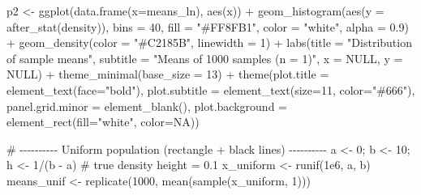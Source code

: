 \documentclass[
  letterpaper,
  DIV=11,
  numbers=noendperiod]{scrreprt}
\newenvironment{Shaded}{\begin{snugshade}}{\end{snugshade}}
\newcommand{\AttributeTok}[1]{\textcolor[rgb]{0.40,0.45,0.13}{#1}}
\newcommand{\CommentTok}[1]{\textcolor[rgb]{0.37,0.37,0.37}{#1}}
\newcommand{\ConstantTok}[1]{\textcolor[rgb]{0.56,0.35,0.01}{#1}}
\newcommand{\DecValTok}[1]{\textcolor[rgb]{0.68,0.00,0.00}{#1}}
\newcommand{\FloatTok}[1]{\textcolor[rgb]{0.68,0.00,0.00}{#1}}
\newcommand{\FunctionTok}[1]{\textcolor[rgb]{0.28,0.35,0.67}{#1}}
\newcommand{\NormalTok}[1]{\textcolor[rgb]{0.00,0.23,0.31}{#1}}
\newcommand{\OtherTok}[1]{\textcolor[rgb]{0.00,0.23,0.31}{#1}}
\newcommand{\SpecialCharTok}[1]{\textcolor[rgb]{0.37,0.37,0.37}{#1}}
\newcommand{\StringTok}[1]{\textcolor[rgb]{0.13,0.47,0.30}{#1}}
\begin{document}
\begin{Shaded}
\begin{Highlighting}[]
\NormalTok{p2 }\OtherTok{\textless{}{-}} \FunctionTok{ggplot}\NormalTok{(}\FunctionTok{data.frame}\NormalTok{(}\AttributeTok{x=}\NormalTok{means\_ln), }\FunctionTok{aes}\NormalTok{(x)) }\SpecialCharTok{+}
  \FunctionTok{geom\_histogram}\NormalTok{(}\FunctionTok{aes}\NormalTok{(}\AttributeTok{y =} \FunctionTok{after\_stat}\NormalTok{(density)),}
                 \AttributeTok{bins =} \DecValTok{40}\NormalTok{, }\AttributeTok{fill =} \StringTok{"\#FF8FB1"}\NormalTok{, }\AttributeTok{color =} \StringTok{"white"}\NormalTok{, }\AttributeTok{alpha =} \FloatTok{0.9}\NormalTok{) }\SpecialCharTok{+}
  \FunctionTok{geom\_density}\NormalTok{(}\AttributeTok{color =} \StringTok{"\#C2185B"}\NormalTok{, }\AttributeTok{linewidth =} \DecValTok{1}\NormalTok{) }\SpecialCharTok{+}
  \FunctionTok{labs}\NormalTok{(}\AttributeTok{title =} \StringTok{"Distribution of sample means"}\NormalTok{,}
       \AttributeTok{subtitle =} \StringTok{"Means of 1000 samples (n = 1)"}\NormalTok{,}
       \AttributeTok{x =} \ConstantTok{NULL}\NormalTok{, }\AttributeTok{y =} \ConstantTok{NULL}\NormalTok{) }\SpecialCharTok{+}
  \FunctionTok{theme\_minimal}\NormalTok{(}\AttributeTok{base\_size =} \DecValTok{13}\NormalTok{) }\SpecialCharTok{+}
  \FunctionTok{theme}\NormalTok{(}\AttributeTok{plot.title =} \FunctionTok{element\_text}\NormalTok{(}\AttributeTok{face=}\StringTok{"bold"}\NormalTok{),}
        \AttributeTok{plot.subtitle =} \FunctionTok{element\_text}\NormalTok{(}\AttributeTok{size=}\DecValTok{11}\NormalTok{, }\AttributeTok{color=}\StringTok{"\#666"}\NormalTok{),}
        \AttributeTok{panel.grid.minor =} \FunctionTok{element\_blank}\NormalTok{(),}
        \AttributeTok{plot.background =} \FunctionTok{element\_rect}\NormalTok{(}\AttributeTok{fill=}\StringTok{"white"}\NormalTok{, }\AttributeTok{color=}\ConstantTok{NA}\NormalTok{))}

\CommentTok{\# {-}{-}{-}{-}{-}{-}{-}{-}{-}{-} Uniform population (rectangle + black lines) {-}{-}{-}{-}{-}{-}{-}{-}{-}{-}}
\NormalTok{a }\OtherTok{\textless{}{-}} \DecValTok{0}\NormalTok{; b }\OtherTok{\textless{}{-}} \DecValTok{10}\NormalTok{; h }\OtherTok{\textless{}{-}} \DecValTok{1}\SpecialCharTok{/}\NormalTok{(b }\SpecialCharTok{{-}}\NormalTok{ a)       }\CommentTok{\# true density height = 0.1}
\NormalTok{x\_uniform }\OtherTok{\textless{}{-}} \FunctionTok{runif}\NormalTok{(}\FloatTok{1e6}\NormalTok{, a, b)}
\NormalTok{means\_unif }\OtherTok{\textless{}{-}} \FunctionTok{replicate}\NormalTok{(}\DecValTok{1000}\NormalTok{, }\FunctionTok{mean}\NormalTok{(}\FunctionTok{sample}\NormalTok{(x\_uniform, }\DecValTok{1}\NormalTok{)))}


\end{Highlighting}
\end{Shaded}
\end{document}

